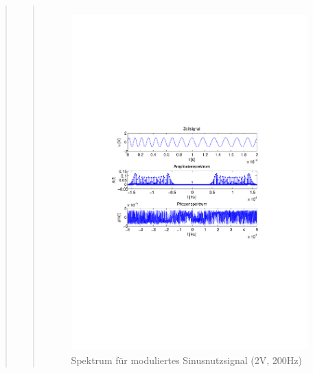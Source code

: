 \begin{quote}
\begin{quote}
\begin{center}
\begin{tabular}{ll}
            \end{tabular}
            \end{center}
            
            
             \begin{figure}[H] \centering
                    \includegraphics[scale=0.5, trim = 4cm 9.5cm 3.5cm
                        9.5cm, clip]{./Bilder/sin_a2_f200}
                        \caption{Spektrum für moduliertes Sinusnutzsignal (2V,
                        200Hz)}
                \end{figure}
            

\end{quote}
\end{quote}
